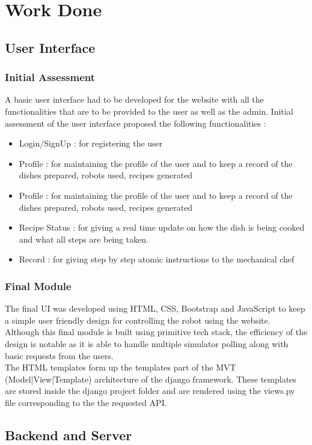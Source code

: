 \chapter{Work Done}
\section{User Interface}
\subsection{Initial Assessment}
{\normalsize A basic user interface had to be developed for the website with all the functionalities that are to be provided to the user as well as the admin.
Initial assessment of the user interface proposed the following functionalities : 
\begin{itemize}
    \item Login/SignUp : for registering the user 
    \item Profile : for maintaining the profile of the user and to keep a record of the dishes prepared, robots used, recipes generated
    \item Profile : for maintaining the profile of the user and to keep a record of the dishes prepared, robots used, recipes generated
    \item Recipe Status : for giving a real time update on how the dish is being cooked and what all steps are being taken.
    \item Record : for giving step by step atomic instructions to the mechanical chef 
\end{itemize}
}
\subsection{Final Module}
{\normalsize The final UI was developed using HTML, CSS, Bootstrap and JavaScript to keep a simple user friendly design for controlling the robot using the website. \\[0.1in]
Although this final module is built using primitive tech stack, the efficiency of the design is notable as it is able to handle multiple simulator polling along with basic requests from the users.\\[0.1in]
The HTML templates form up the templates part of the MVT (Model|View|Template) architecture of the django framework. These templates are stored inside the django project folder and are rendered using the views.py file corresponding to the the requested API.
}
\section{Backend and Server}
